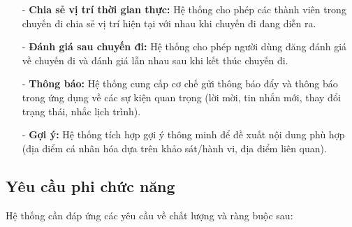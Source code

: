 \begin{itemize}
    \item[-] \textbf{Chia sẻ vị trí thời gian thực:}  Hệ thống cho phép các thành viên trong chuyến đi chia sẻ vị trí hiện tại với nhau khi chuyến đi đang diễn ra.
    \item[-] \textbf{Đánh giá sau chuyến đi:}  Hệ thống cho phép người dùng đăng đánh giá về chuyến đi và đánh giá lẫn nhau sau khi kết thúc chuyến đi.
    \item[-] \textbf{Thông báo:}  Hệ thống cung cấp cơ chế gửi thông báo đẩy và thông báo trong ứng dụng về các sự kiện quan trọng (lời mời, tin nhắn mới, thay đổi trạng thái, nhắc lịch trình).
    \item[-] \textbf{Gợi ý:}  Hệ thống tích hợp gợi ý thông minh để đề xuất nội dung phù hợp (địa điểm cá nhân hóa dựa trên khảo sát/hành vi, địa điểm liên quan).
\end{itemize}

\subsection{Yêu cầu phi chức năng}

Hệ thống cần đáp ứng các yêu cầu về chất lượng và ràng buộc sau:


